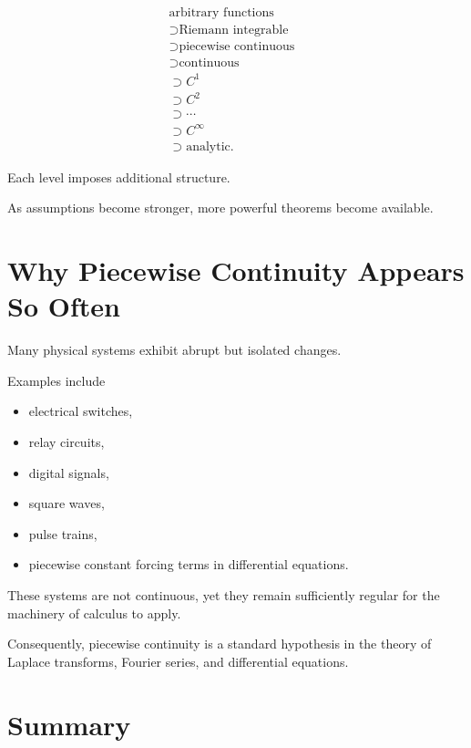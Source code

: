 \documentclass{essay}
\begin{document}
\[
  \begin{aligned}
    \text{arbitrary functions}
    &\\
    \supset
    \text{Riemann integrable}
    &\\
    \supset
    \text{piecewise continuous}
    &\\
    \supset
    \text{continuous}
    &\\
    \supset
    C^{1}
    &\\
    \supset
    C^{2}
    &\\
    \supset
    \cdots
    &\\
    \supset
    C^{\infty}
    &\\
    \supset
    \text{analytic}.
  \end{aligned}
\]

Each level imposes additional structure.

As assumptions become stronger, more powerful theorems become available.


\section{Why Piecewise Continuity Appears So Often}

Many physical systems exhibit abrupt but isolated changes.

Examples include

\begin{itemize}
  \item electrical switches,
  \item relay circuits,
  \item digital signals,
  \item square waves,
  \item pulse trains,
  \item piecewise constant forcing terms in differential equations.
\end{itemize}

These systems are not continuous, yet they remain sufficiently regular for the
machinery of calculus to apply.

Consequently, piecewise continuity is a standard hypothesis in the theory of
Laplace transforms, Fourier series, and differential equations.


\section{Summary}
\end{document}
